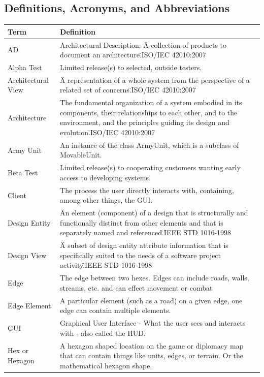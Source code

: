\documentclass[12pt,a4paper,titlepage]{article}
\begin{document}
\subsection{Definitions, Acronyms, and Abbreviations}
\small{
\begin{center}
\keepXColumns
\noindent\begin{tabularx}{\linewidth}{|p{1.5in}|X|}\hline
\textbf{Term} & \textbf{Definition}\\
\hline
AD & Architectural Description: \"A collection of products to document an architecture.\"\space ISO/IEC 42010:2007\\
\hline
Alpha Test & Limited release(s) to selected, outside testers.\\
\hline
Architectural View & \"A representation of a whole system from the perspective of a related set of concerns.\"\space ISO/IEC 42010:2007\\
\hline
Architecture & \"The fundamental organization of a system embodied in its components, their relationships to each other, and to the environment, and the principles guiding its design and evolution.\"\space ISO/IEC 42010:2007\\
\hline
Army Unit & An instance of the class ArmyUnit, which is a subclass of MovableUnit.\\
\hline
Beta Test & Limited release(s) to cooperating customers wanting early access to developing systems.\\
\hline
Client & The process the user directly interacts with, containing, among other things, the GUI.\\
\hline
Design Entity & \"An element (component) of a design that is structurally and functionally distinct from other elements and that is separately named and referenced.\"\space IEEE STD 1016-1998\\
\hline
Design View & \"A subset of design entity attribute information that is specifically suited to the needs of a software project activity.\"\space IEEE STD 1016-1998\\
\hline
Edge & The edge between two hexes. Edges can include roads, walls, streams, etc. and can effect movement or combat\\
\hline
Edge Element & A particular element (such as a road) on a given edge, one edge can contain multiple elements.\\
\hline
GUI & Graphical User Interface - What the user sees and interacts with - also called the HUD.\\
\hline
Hex or Hexagon & A hexagon shaped location on the game or diplomacy map that can contain things like units, edges, or terrain. Or the mathematical hexagon shape.\\

\end{tabularx}
\end{center}}
\end{document}
